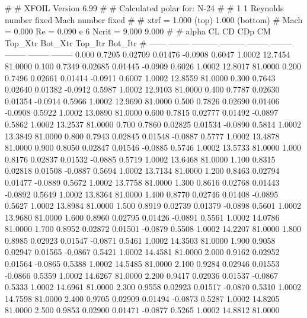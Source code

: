 #  
#       XFOIL         Version 6.99
#  
# Calculated polar for: N-24                                            
#  
# 1 1 Reynolds number fixed          Mach number fixed         
#  
# xtrf =   1.000 (top)        1.000 (bottom)  
# Mach =   0.000     Re =     0.090 e 6     Ncrit =   9.000  9.000
#  
#   alpha    CL        CD       CDp       CM     Top_Xtr  Bot_Xtr  Top_Itr  Bot_Itr
#  ------ -------- --------- --------- -------- -------- -------- -------- --------
   0.000   0.7205   0.02709   0.01476  -0.0908   0.6047   1.0002  12.7454  81.0000
   0.100   0.7349   0.02685   0.01445  -0.0909   0.6026   1.0002  12.8017  81.0000
   0.200   0.7496   0.02661   0.01414  -0.0911   0.6007   1.0002  12.8559  81.0000
   0.300   0.7643   0.02640   0.01382  -0.0912   0.5987   1.0002  12.9103  81.0000
   0.400   0.7787   0.02630   0.01354  -0.0914   0.5966   1.0002  12.9690  81.0000
   0.500   0.7826   0.02690   0.01406  -0.0908   0.5922   1.0002  13.0890  81.0000
   0.600   0.7815   0.02777   0.01492  -0.0897   0.5862   1.0002  13.2537  81.0000
   0.700   0.7860   0.02825   0.01534  -0.0890   0.5814   1.0002  13.3849  81.0000
   0.800   0.7943   0.02845   0.01548  -0.0887   0.5777   1.0002  13.4878  81.0000
   0.900   0.8050   0.02847   0.01546  -0.0885   0.5746   1.0002  13.5733  81.0000
   1.000   0.8176   0.02837   0.01532  -0.0885   0.5719   1.0002  13.6468  81.0000
   1.100   0.8315   0.02818   0.01508  -0.0887   0.5694   1.0002  13.7134  81.0000
   1.200   0.8463   0.02794   0.01477  -0.0889   0.5672   1.0002  13.7758  81.0000
   1.300   0.8616   0.02768   0.01443  -0.0892   0.5649   1.0002  13.8364  81.0000
   1.400   0.8770   0.02746   0.01408  -0.0895   0.5627   1.0002  13.8984  81.0000
   1.500   0.8919   0.02739   0.01379  -0.0898   0.5601   1.0002  13.9680  81.0000
   1.600   0.8960   0.02795   0.01426  -0.0891   0.5561   1.0002  14.0786  81.0000
   1.700   0.8952   0.02872   0.01501  -0.0879   0.5508   1.0002  14.2207  81.0000
   1.800   0.8985   0.02923   0.01547  -0.0871   0.5461   1.0002  14.3503  81.0000
   1.900   0.9058   0.02947   0.01565  -0.0867   0.5421   1.0002  14.4581  81.0000
   2.000   0.9162   0.02952   0.01564  -0.0865   0.5388   1.0002  14.5485  81.0000
   2.100   0.9284   0.02946   0.01553  -0.0866   0.5359   1.0002  14.6267  81.0000
   2.200   0.9417   0.02936   0.01537  -0.0867   0.5333   1.0002  14.6961  81.0000
   2.300   0.9558   0.02923   0.01517  -0.0870   0.5310   1.0002  14.7598  81.0000
   2.400   0.9705   0.02909   0.01494  -0.0873   0.5287   1.0002  14.8205  81.0000
   2.500   0.9853   0.02900   0.01471  -0.0877   0.5265   1.0002  14.8812  81.0000
